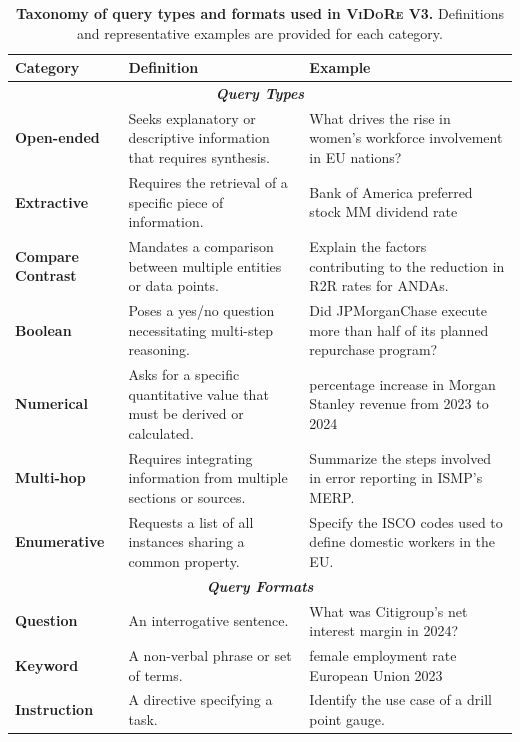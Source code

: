 \begin{table}[t!]
\centering
\small %
\begin{tabularx}{\textwidth}{lXX} %
\toprule
\textbf{Category} & \textbf{Definition} & \textbf{Example} \\ \midrule
\multicolumn{3}{c}{\textit{\textbf{Query Types}}} \\ \midrule
\textbf{Open-ended} & Seeks explanatory or descriptive information that requires synthesis. & What drives the rise in women's workforce involvement in EU nations? \\
\textbf{Extractive} & Requires the retrieval of a specific piece of information. & Bank of America preferred stock MM dividend rate \\
\textbf{Compare Contrast} & Mandates a comparison between multiple entities or data points. & Explain the factors contributing to the reduction in R2R rates for ANDAs. \\
\textbf{Boolean} & Poses a yes/no question necessitating multi-step reasoning. & Did JPMorganChase execute more than half of its planned repurchase program? \\
\textbf{Numerical} & Asks for a specific quantitative value that must be derived or calculated. & percentage increase in Morgan Stanley revenue from 2023 to 2024 \\
\textbf{Multi-hop} & Requires integrating information from multiple sections or sources. & Summarize the steps involved in error reporting in ISMP's MERP. \\
\textbf{Enumerative} & Requests a list of all instances sharing a common property. & Specify the ISCO codes used to define domestic workers in the EU. \\ \midrule
\multicolumn{3}{c}{\textit{\textbf{Query Formats}}} \\ \midrule
\textbf{Question} & An interrogative sentence. & What was Citigroup's net interest margin in 2024? \\
\textbf{Keyword} & A non-verbal phrase or set of terms. & female employment rate European Union 2023 \\
\textbf{Instruction} & A directive specifying a task. & Identify the use case of a drill point gauge. \\ \bottomrule
\end{tabularx}
\caption[Query taxonomy used in \textsc{ViDoRe} V3]{\textbf{Taxonomy of query types and formats used in \textsc{ViDoRe} V3.} Definitions and representative examples are provided for each category.}
\label{vidorev3:tab:query_taxonomy}
\end{table}

